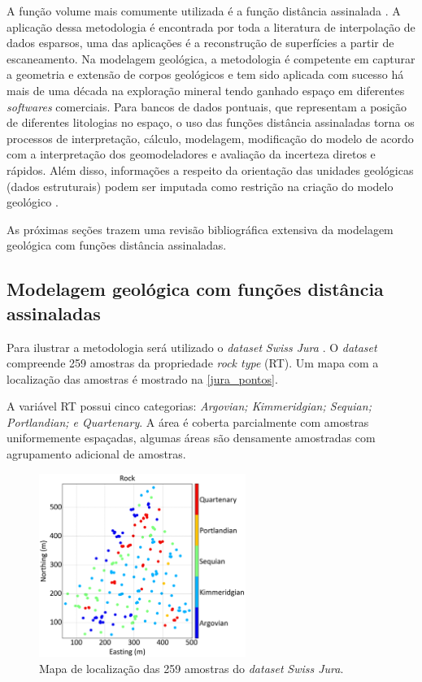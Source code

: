 A função volume mais comumente utilizada é a função distância assinalada \cite{osherlevelsetmethods}. A aplicação dessa metodologia é encontrada por toda a literatura de interpolação de dados esparsos, uma das aplicações é a reconstrução de superfícies a partir de escaneamento. Na modelagem geológica, a metodologia é competente em capturar a geometria e extensão de corpos geológicos e tem sido aplicada com sucesso há mais de uma década na exploração mineral tendo ganhado espaço em diferentes \textit{softwares} comerciais. Para bancos de dados pontuais, que representam a posição  de diferentes litologias no espaço, o uso das funções distância assinaladas torna os processos de interpretação, cálculo, modelagem, modificação do modelo de acordo com a interpretação dos geomodeladores e avaliação da incerteza diretos e rápidos. Além disso, informações a respeito da orientação das unidades geológicas (dados estruturais) podem ser imputada como restrição na criação do modelo geológico \cite{martin2017implicitmodeling}.

As próximas seções trazem uma revisão bibliográfica extensiva da modelagem geológica com funções distância assinaladas.

\subsection{Modelagem geológica com funções distância assinaladas}

Para  ilustrar a metodologia será utilizado o \textit{dataset} \textit{Swiss Jura} \cite{goovaerts1997geostatistics}. O \textit{dataset} compreende 259 amostras da propriedade \textit{rock type} (RT). Um mapa com a localização das amostras é mostrado na \autoref{jura_pontos}.

A variável RT possui cinco categorias: \textit{Argovian; Kimmeridgian; Sequian;
Portlandian; e Quartenary}. A área é coberta parcialmente com amostras uniformemente espaçadas, algumas áreas são densamente amostradas com agrupamento adicional de amostras.

\begin{figure}[H]
	\centering
	\caption{\label{jura_pontos}Mapa de localização das 259 amostras do \textit{dataset} \textit{Swiss Jura}.}
	\includegraphics[width=0.6\textwidth]{capitulo_2/imagens/points.png}
\end{figure}

